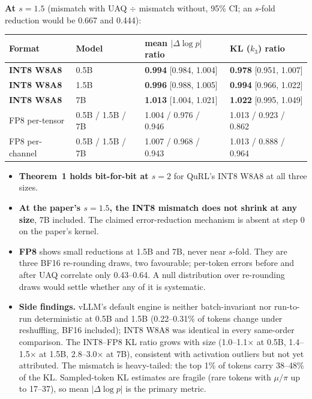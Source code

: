 \documentclass[11pt]{article}
\begin{document}
\textbf{At $s=1.5$} (mismatch with UAQ $\div$ mismatch without, 95\% CI; an $s$-fold reduction would be 0.667 and 0.444):
\begin{center}\small
\begin{tabular}{@{}llll@{}}
\toprule
Format & Model & mean $|\Delta\log p|$ ratio & KL ($k_3$) ratio\\
\midrule
\textbf{INT8 W8A8} & 0.5B & \textbf{0.994} [0.984, 1.004] & \textbf{0.978} [0.951, 1.007]\\
\textbf{INT8 W8A8} & 1.5B & \textbf{0.996} [0.988, 1.005] & \textbf{0.994} [0.966, 1.022]\\
\textbf{INT8 W8A8} & 7B & \textbf{1.013} [1.004, 1.021] & \textbf{1.022} [0.995, 1.049]\\
FP8 per-tensor & 0.5B / 1.5B / 7B & 1.004 / 0.976 / 0.946 & 1.013 / 0.923 / 0.862\\
FP8 per-channel & 0.5B / 1.5B / 7B & 1.007 / 0.968 / 0.943 & 1.013 / 0.888 / 0.964\\
\bottomrule
\end{tabular}
\end{center}
\begin{itemize}
\item \textbf{Theorem~1 holds bit-for-bit at $s=2$} for QuRL's INT8 W8A8 at all three sizes.
\item \textbf{At the paper's $s=1.5$, the INT8 mismatch does not shrink at any size}, 7B included. The claimed error-reduction mechanism is absent at step 0 on the paper's kernel.
\item \textbf{FP8} shows small reductions at 1.5B and 7B, never near $s$-fold. They are three BF16 re-rounding draws, two favourable; per-token errors before and after UAQ correlate only 0.43--0.64. A null distribution over re-rounding draws would settle whether any of it is systematic.
\item \textbf{Side findings.} vLLM's default engine is neither batch-invariant nor run-to-run deterministic at 0.5B and 1.5B (0.22--0.31\% of tokens change under reshuffling, BF16 included); INT8 W8A8 was identical in every same-order comparison. The INT8--FP8 KL ratio grows with size (1.0--1.1$\times$ at 0.5B, 1.4--1.5$\times$ at 1.5B, 2.8--3.0$\times$ at 7B), consistent with activation outliers \citep{dettmers2022llmint8,xiao2023smoothquant} but not yet attributed. The mismatch is heavy-tailed: the top 1\% of tokens carry 38--48\% of the KL. Sampled-token KL estimates are fragile (rare tokens with $\mu/\pi$ up to 17--37), so mean $|\Delta\log p|$ is the primary metric.
\end{itemize}
\end{document}
